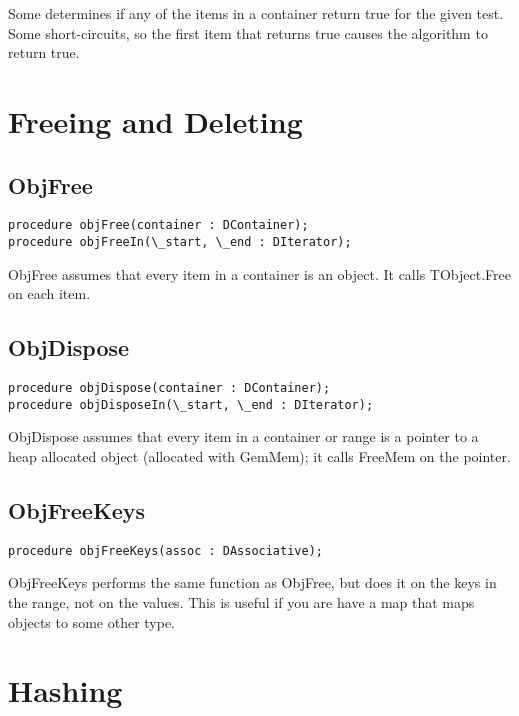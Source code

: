 \documentclass{report}
\begin{document}
Some determines if any of the items in a container return true for the given
test. Some short-circuits, so the first item that returns true causes the
algorithm to return true.

\section{Freeing and Deleting}

\subsection{ObjFree}

\begin{lstlisting}
procedure objFree(container : DContainer);
procedure objFreeIn(\_start, \_end : DIterator);
\end{lstlisting}

ObjFree assumes that every item in a container is an object. It calls
TObject.Free on each item.

\subsection{ObjDispose}

\begin{lstlisting}
procedure objDispose(container : DContainer);
procedure objDisposeIn(\_start, \_end : DIterator);
\end{lstlisting}

ObjDispose assumes that every item in a container or range is a pointer to a
heap allocated object (allocated with GemMem); it calls FreeMem on the
pointer.

\subsection{ObjFreeKeys}

\begin{lstlisting}
procedure objFreeKeys(assoc : DAssociative);
\end{lstlisting}

ObjFreeKeys performs the same function as ObjFree, but does it on the keys
in the range, not on the values. This is useful if you are have a map that
maps objects to some other type.

\section{Hashing}
\end{document}
